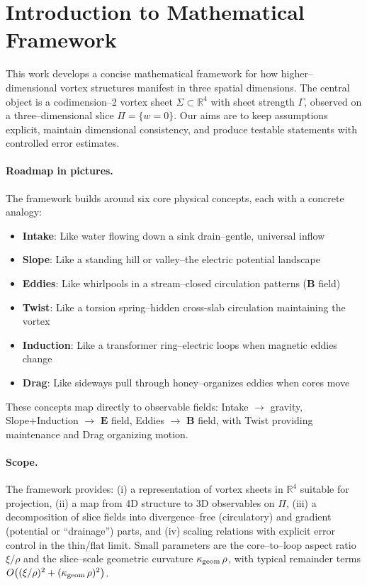 \section{Introduction to Mathematical Framework}

This work develops a concise mathematical framework for how higher–dimensional vortex structures manifest in three spatial dimensions. The central object is a codimension–2 vortex sheet $\Sigma\subset\mathbb{R}^4$ with sheet strength $\Gamma$, observed on a three–dimensional slice $\Pi=\{w=0\}$. Our aims are to keep assumptions explicit, maintain dimensional consistency, and produce testable statements with controlled error estimates.

\paragraph{Roadmap in pictures.}
The framework builds around six core physical concepts, each with a concrete analogy:
\begin{itemize}
  \item \textbf{Intake}: Like water flowing down a sink drain--gentle, universal inflow
  \item \textbf{Slope}: Like a standing hill or valley--the electric potential landscape
  \item \textbf{Eddies}: Like whirlpools in a stream--closed circulation patterns ($\mathbf{B}$ field)
  \item \textbf{Twist}: Like a torsion spring--hidden cross-slab circulation maintaining the vortex
  \item \textbf{Induction}: Like a transformer ring--electric loops when magnetic eddies change
  \item \textbf{Drag}: Like sideways pull through honey--organizes eddies when cores move
\end{itemize}
These concepts map directly to observable fields: Intake $\to$ gravity, Slope+Induction $\to$ $\mathbf{E}$ field, Eddies $\to$ $\mathbf{B}$ field, with Twist providing maintenance and Drag organizing motion.

\paragraph{Scope.}
The framework provides:
(i) a representation of vortex sheets in $\mathbb{R}^4$ suitable for projection,
(ii) a map from 4D structure to 3D observables on $\Pi$,
(iii) a decomposition of slice fields into divergence–free (circulatory) and gradient (potential or ``drainage'') parts, and
(iv) scaling relations with explicit error control in the thin/flat limit.
Small parameters are the core–to–loop aspect ratio $\xi/\rho$ and the slice–scale geometric curvature $\kappa_{\rm geom}\,\rho$, with typical remainder terms $O\!\left((\xi/\rho)^2+(\kappa_{\rm geom}\,\rho)^2\right)$.

